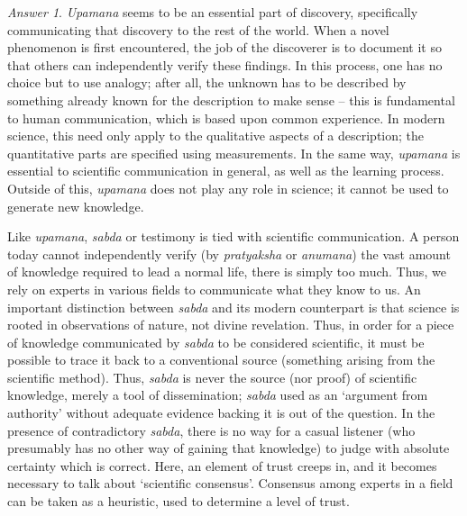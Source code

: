 \documentclass[11pt]{article}
\theoremstyle{remark}
\newtheorem*{answer}{Answer}
\begin{document}
\begin{answer}
        \emph{Upamana} seems to be an essential part of discovery, specifically
        communicating that discovery to the rest of the world. When a novel phenomenon
        is first encountered, the job of the discoverer is to document it so that
        others can independently verify these findings. In this process, one has no
        choice but to use analogy; after all, the unknown has to be described by
        something already known for the description to make sense -- this is
        fundamental to human communication, which is based upon common experience. In
        modern science, this need only apply to the qualitative aspects of a
        description; the quantitative parts are specified using measurements. In the
        same way, \emph{upamana} is essential to scientific communication in general,
        as well as the learning process. Outside of this, \emph{upamana} does not
        play any role in science; it cannot be used to generate new knowledge.

        Like \emph{upamana}, \emph{sabda} or testimony is tied with scientific
        communication. A person today cannot independently verify (by
        \emph{pratyaksha} or \emph{anumana}) the vast amount of knowledge required to
        lead a normal life, there is simply too much. Thus, we rely on experts in
        various fields to communicate what they know to us. An important distinction
        between \emph{sabda} and its modern counterpart is that science is rooted in
        observations of nature, not divine revelation. Thus, in order for a piece of
        knowledge communicated by \emph{sabda} to be considered scientific, it must
        be possible to trace it back to a conventional source (something arising from
        the scientific method). Thus, \emph{sabda} is never the source (nor proof)
        of scientific knowledge, merely a tool of dissemination; \emph{sabda} used
        as an `argument from authority' without adequate evidence backing it is out
        of the question. In the presence of contradictory \emph{sabda}, there is no
        way for a casual listener (who presumably has no other way of gaining that
        knowledge) to judge with absolute certainty which is correct. Here, an
        element of trust creeps in, and it becomes necessary to talk about
        `scientific consensus'. Consensus among experts in a field can be taken as a
        heuristic, used to determine a level of trust.


    \end{answer}
\end{document}
